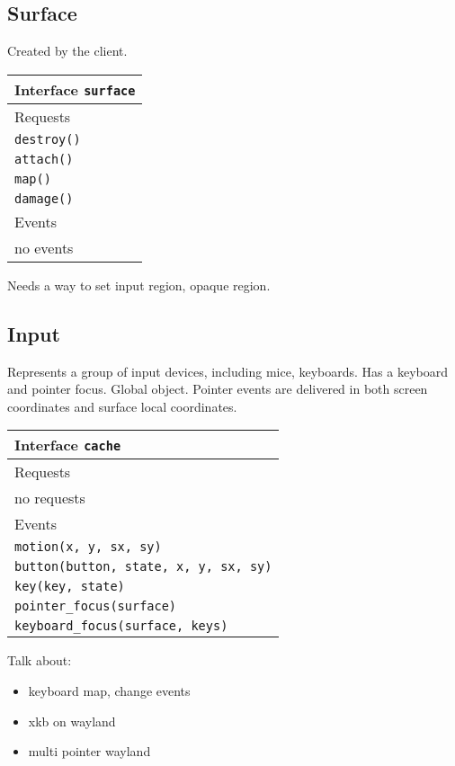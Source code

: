 \documentclass{article}
\begin{document}
\subsection{Surface}

Created by the client.

\begin{tabular}{l}
  \hline 
  Interface \texttt{surface} \\ \hline 
  Requests \\ \hline 
  \texttt{destroy()} \\
  \texttt{attach()} \\
  \texttt{map()} \\
  \texttt{damage()} \\ \hline
  Events \\ \hline
  no events \\ \hline
\end{tabular}

Needs a way to set input region, opaque region.

\subsection{Input}

Represents a group of input devices, including mice, keyboards.  Has a
keyboard and pointer focus.  Global object.  Pointer events are
delivered in both screen coordinates and surface local coordinates.

\begin{tabular}{l}
  \hline 
  Interface \texttt{cache} \\ \hline 
  Requests \\ \hline 
  no requests \\ \hline
  Events \\ \hline
  \texttt{motion(x, y, sx, sy)} \\
  \texttt{button(button, state, x, y, sx, sy)} \\
  \texttt{key(key, state)} \\
  \texttt{pointer\_focus(surface)} \\
  \texttt{keyboard\_focus(surface, keys)} \\ \hline
\end{tabular}

Talk about:

\begin{itemize}
\item keyboard map, change events
\item xkb on wayland
\item multi pointer wayland
\end{itemize}
\end{document}
